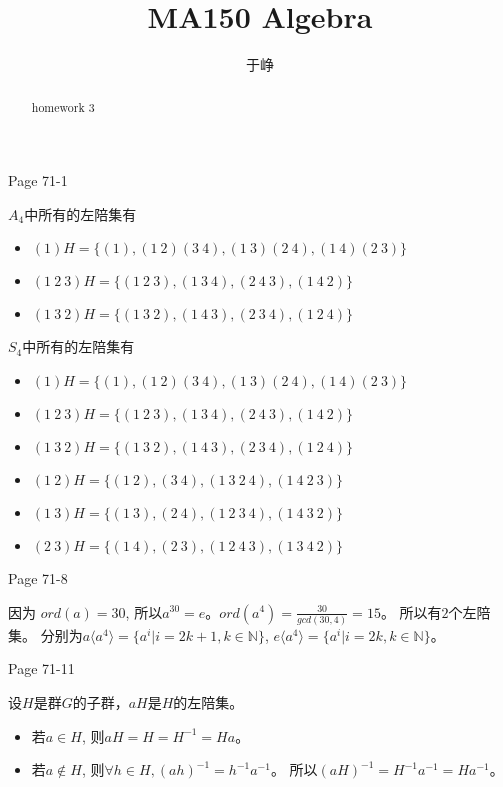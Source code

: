 \documentclass{ximera}
\title{MA150 Algebra}
\author{于峥}
\begin{document}
\begin{abstract}
    homework 3
\end{abstract}

\begin{problem} Page 71-1
    \begin{solution}
        $A_4$中所有的左陪集有
        \begin{itemize}
            \item $(1)H = \{(1), (1~2)(3~4),(1~3)(2~4),(1~4)(2~3)\}$
            \item $(1~2~3)H=\{(1~2~3),(1~3~4),(2~4~3),(1~4~2)\}$
            \item $(1~3~2)H=\{(1~3~2),(1~4~3),(2~3~4),(1~2~4)\}$
        \end{itemize}
        $S_4$中所有的左陪集有
        \begin{itemize}
            \item $(1)H = \{(1), (1~2)(3~4),(1~3)(2~4),(1~4)(2~3)\}$
            \item $(1~2~3)H=\{(1~2~3),(1~3~4),(2~4~3),(1~4~2)\}$
            \item $(1~3~2)H=\{(1~3~2),(1~4~3),(2~3~4),(1~2~4)\}$
            \item $(1~2)H=\{(1~2),(3~4),(1\ 3\ 2\ 4),(1\ 4\ 2\ 3)\}$
            \item $(1~3)H=\{(1~3),(2~4),(1\ 2\ 3\ 4),(1\ 4\ 3\ 2)\}$
            \item $(2~3)H=\{(1~4),(2~3),(1\ 2\ 4\ 3),(1\ 3\ 4\ 2)\}$
        \end{itemize}

    \end{solution}
\end{problem}

\begin{problem} Page 71-8
    \begin{solution}
        因为 $ord(a) = 30$, 所以$a ^ {30} = e$。$ord(a^4) = \frac {30} {gcd(30, 4)} = 15$。
        所以有$2$个左陪集。
        分别为$a\langle a^4 \rangle=\{a^i|i = 2k+1, k\in \mathbb{N}\}$,
        $e\langle a^4 \rangle=\{a^i|i = 2k, k\in \mathbb{N}\}$。
    \end{solution}
\end{problem}

\begin{problem} Page 71-11
    \begin{solution}
        设$H$是群$G$的子群，$aH$是$H$的左陪集。
        \begin{itemize}
        \item 若$a \in H$,  则$aH=H=H^{-1}=Ha$。
        \item 若$a \not\in H$, 则$\forall h \in H, (ah)^{-1} = h^{-1}a^{-1}$。
        所以$(aH)^{-1}=H^{-1}a^{-1}=Ha^{-1}$。
        \end{itemize}
    \end{solution}
\end{problem}
\end{document}
